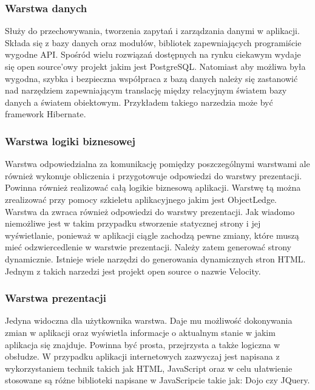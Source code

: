 \subsubsection{Warstwa danych}
Służy do przechowywania, tworzenia zapytań i zarządzania danymi w aplikacji. Składa się z bazy danych oraz 
modułów, bibliotek zapewniających programiście wygodne API. Spośród wielu rozwiązań dostępnych na rynku 
ciekawym wydaje się open source'owy projekt jakim jest PostgreSQL. Natomiast aby możliwa była wygodna, szybka
i bezpieczna współpraca z bazą danych należy się zastanowić nad narzędziem zapewniającym translację między 
relacyjnym światem bazy danych a światem obiektowym. Przykładem takiego narzedzia może być framework Hibernate.
\subsubsection{Warstwa logiki biznesowej}
Warstwa odpowiedzialna za komunikację pomiędzy poszczególnymi warstwami ale również wykonuje obliczenia
i przygotowuje odpowiedzi do warstwy prezentacji. Powinna również realizować całą logikie biznesową aplikacji.
Warstwę tą można zrealizować przy pomocy szkieletu aplikacyjnego jakim jest ObjectLedge. Warstwa da zwraca
również odpowiedzi do warstwy prezentacji. Jak wiadomo niemożliwe jest w takim przypadku
stworzenie statycznej strony i jej wyświetlanie, ponieważ w aplikacji ciągle zachodzą pewne zmiany, które
muszą mieć odzwiercedlenie w warstwie prezentacji. Należy zatem generować strony dynamicznie. 
 Istnieje wiele
narzędzi do generowania dynamicznych stron HTML. Jednym z takich narzedzi jest projekt open source o nazwie
Velocity.

\subsubsection{Warstwa prezentacji}

Jedyna widoczna dla użytkownika warstwa. Daje mu możliwość dokonywania zmian w aplikacji oraz wyświetla
informacje o aktualnym stanie w jakim aplikacja się znajduje. Powinna być prosta, przejrzysta a także 
logiczna w obsłudze. W przypadku aplikacji internetowych zazwyczaj jest napisana z wykorzystaniem
technik takich jak HTML, JavaScript oraz  w celu ułatwienie stosowane są różne biblioteki napisane 
w JavaScripcie takie jak: Dojo czy JQuery.

